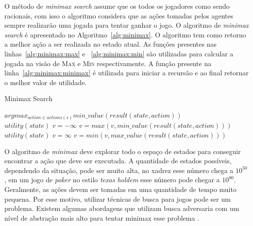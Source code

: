 O método de \textit{minimax search} assume que os todos os jogadores como sendo racionais, com isso o algoritmo considera que as ações tomadas pelos agentes sempre realizarão uma jogada para tentar ganhar o jogo. O algoritmo de \textit{minimax search} é apresentado no Algoritmo~\ref{alg:minimax}. O algoritmo tem como retorno a melhor ação a ser realizada no estado atual. As funções presentes nas linhas~\ref{alg:minimax:max} e ~\ref{alg:minimax:min} são utilizadas para calcular a jogada na visão de \textsc{Max} e \textsc{Min} respectivamente.
A função presente na linha~\ref{alg:minimax:minimax} é utilizada para iniciar a recursão e ao final retornar o melhor valor de utilidade.

\begin{algorithm}
	\caption{Minimax Search}
	\label{alg:minimax}
	\begin{algorithmic}[1]	
		 \label{alg:minimax:minimax}
		\State \Return $arg max_{action \in actions(s)} min\_value(result(state, action)) $
		\EndFunction \\
		\label{alg:minimax:max}
		\State	\Return $utility(state)$
		\EndIf
		\State $v = -\infty$
		\State $v = max(v, min\_value(result(state,action)))$
		\EndFor	
		\EndFunction \\
		\label{alg:minimax:min}
		\State	\Return $utility(state)$
		\EndIf
		\State $v = \infty$
		\State $v = min(v, max\_value(result(state,action)))$
		\EndFor	
		\EndFunction
	\end{algorithmic}
\end{algorithm}

O algoritmo de \textit{minimax} deve explorar todo o espaço de estados para conseguir encontrar a ação que deve ser executada. A quantidade de estados possíveis, dependendo da situação, pode ser muito alta, no xadrez esse número chega a $10^{50}$, em um jogo de \textit{poker} no estilo \textit{texas holdem} esse número pode chegar a $10^{80}$. Geralmente, as ações devem ser tomadas em uma quantidade de tempo muito pequena. Por esse motivo, utilizar técnicas de busca para jogos pode ser um problema. Existem algumas abordagens que utilizam busca adversaria com um nível de abstração mais alto para tentar minimax esse problema \cite{ontanon2013survey}.  

